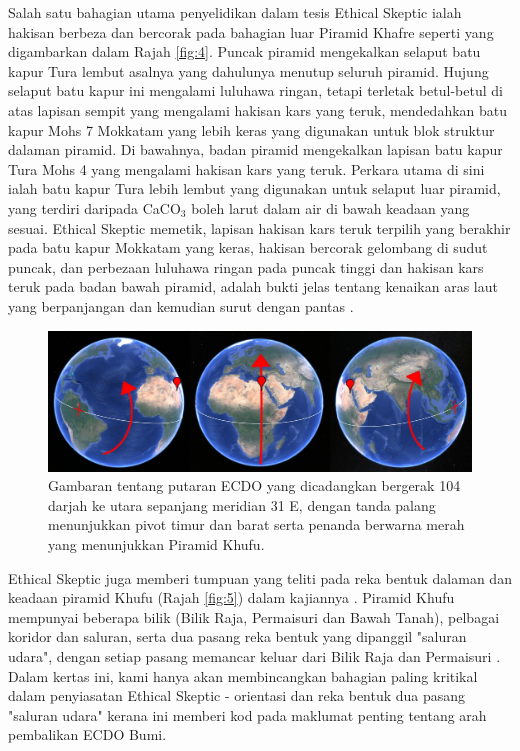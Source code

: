 \documentclass[10pt,twocolumn,letterpaper]{article}
\begin{document}
Salah satu bahagian utama penyelidikan dalam tesis Ethical Skeptic ialah hakisan berbeza dan bercorak pada bahagian luar Piramid Khafre seperti yang digambarkan dalam Rajah \ref{fig:4}. Puncak piramid mengekalkan selaput batu kapur Tura lembut asalnya yang dahulunya menutup seluruh piramid. Hujung selaput batu kapur ini mengalami luluhawa ringan, tetapi terletak betul-betul di atas lapisan sempit yang mengalami hakisan kars yang teruk, mendedahkan batu kapur Mohs 7 Mokkatam yang lebih keras yang digunakan untuk blok struktur dalaman piramid. Di bawahnya, badan piramid mengekalkan lapisan batu kapur Tura Mohs 4 yang mengalami hakisan kars yang teruk. Perkara utama di sini ialah batu kapur Tura lebih lembut yang digunakan untuk selaput luar piramid, yang terdiri daripada CaCO$_3$ boleh larut dalam air di bawah keadaan yang sesuai. Ethical Skeptic memetik, lapisan hakisan kars teruk terpilih yang berakhir pada batu kapur Mokkatam yang keras, hakisan bercorak gelombang di sudut puncak, dan perbezaan luluhawa ringan pada puncak tinggi dan hakisan kars teruk pada badan bawah piramid, adalah bukti jelas tentang kenaikan aras laut yang berpanjangan dan kemudian surut dengan pantas \cite{27}.

\begin{figure}[b]
\begin{center}
\includegraphics[width=1\textwidth]{drawing.jpg}
\end{center}
   \caption{Gambaran tentang putaran ECDO yang dicadangkan bergerak 104 darjah ke utara sepanjang meridian 31 E, dengan tanda palang menunjukkan pivot timur dan barat serta penanda berwarna merah yang menunjukkan Piramid Khufu.}
\label{fig:6}
\end{figure}
Ethical Skeptic juga memberi tumpuan yang teliti pada reka bentuk dalaman dan keadaan piramid Khufu (Rajah \ref{fig:5}) dalam kajiannya \cite{28}. Piramid Khufu mempunyai beberapa bilik (Bilik Raja, Permaisuri dan Bawah Tanah), pelbagai koridor dan saluran, serta dua pasang reka bentuk yang dipanggil "saluran udara", dengan setiap pasang memancar keluar dari Bilik Raja dan Permaisuri \cite{29,30}. Dalam kertas ini, kami hanya akan membincangkan bahagian paling kritikal dalam penyiasatan Ethical Skeptic - orientasi dan reka bentuk dua pasang "saluran udara" kerana ini memberi kod pada maklumat penting tentang arah pembalikan ECDO Bumi.
\end{document}
